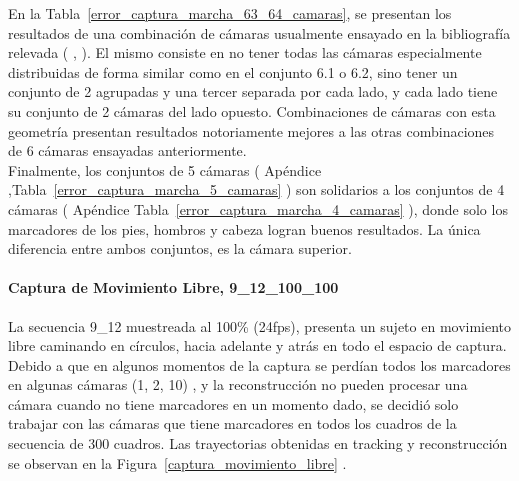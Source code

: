 En la Tabla~\ref{error_captura_marcha_63_64_camaras}, se presentan los resultados de una combinación de cámaras usualmente ensayado en la bibliografía relevada ( \cite{gross2001cmu} , \cite{humaneva} ). El mismo consiste en no tener todas las cámaras especialmente distribuidas de forma similar como en el conjunto 6.1 o 6.2, sino tener un conjunto de 2 agrupadas y una tercer separada por cada lado, y cada lado tiene su conjunto de 2 cámaras del lado opuesto. Combinaciones de cámaras con esta geometría presentan resultados notoriamente mejores a las otras combinaciones de 6 cámaras ensayadas anteriormente.
\\ 

Finalmente, los conjuntos de 5 cámaras ( Apéndice ,Tabla~\ref{error_captura_marcha_5_camaras} ) son solidarios a los conjuntos de 4 cámaras ( Apéndice Tabla~\ref{error_captura_marcha_4_camaras} ), donde solo los marcadores de los pies, hombros y cabeza logran buenos resultados. La única diferencia entre ambos conjuntos, es la cámara superior.

\paragraph{Captura de Movimiento Libre, 9\_12\_100\_100} 

La secuencia 9\_12 muestreada al 100\% (24fps), presenta un sujeto en movimiento libre caminando en círculos, hacia adelante y atrás en todo el espacio de captura. Debido a que en algunos momentos de la captura se perdían todos los marcadores en algunas cámaras (1, 2, 10) , y la reconstrucción no pueden procesar una cámara cuando no tiene marcadores en un momento dado, se decidió solo trabajar con las cámaras que tiene marcadores en todos los cuadros de la secuencia de 300 cuadros. Las trayectorias obtenidas en tracking y reconstrucción se observan en la Figura~\ref{captura_movimiento_libre} .

